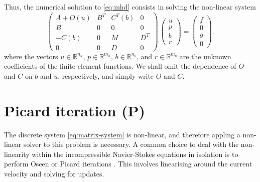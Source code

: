 Thus, the numerical solution to \eqref{eq:mhd} consists in solving the non-linear system
\begin{equation}
\label{eq:matrix-system}
\left(
\begin{array}{cccc}
A+O(u) & B^T & C^T(b) & 0\\
B & 0 & 0 & 0\\
-C(b) & 0 & M & D^T \\
0 & 0 & D & 0
\end{array}
\right)
\,
\left(
\begin{array}{c}
u\\
p\\
b\\
r
\end{array}
\right) =
\left(
\begin{array}{c} f\\0\\g\\0
\end{array}
\right).
\end{equation}
where the vectors  $u\in\mathbb{R}^{n_u}$, $p\in\mathbb{R}^{m_u}$,  $b\in\mathbb{R}^{n_b}$, and $r\in\mathbb{R}^{m_b}$ are the unknown coefficients of the finite element functions. We shall omit the dependence of $O$ and $C$ on $b$ and $u$, respectively, and simply  write $O$ and $C$.

\section{Picard iteration (P)}
\label{sec:nonlinear}
The discrete system \eqref{eq:matrix-system} is non-linear, and therefore appling a non-linear solver to this problem is necessary. A common choice to deal with the non-linearity within the incompressible Navier-Stokes equations in isolation is to perform Oseen or Picard iterations \cite{elman2005finite}. This involves linearising around the current velocity and solving for updates.

